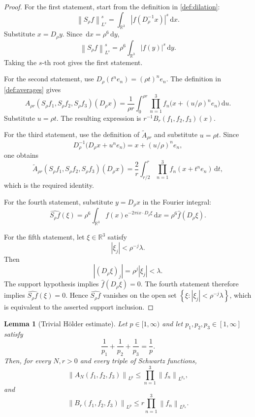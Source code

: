 \documentclass[11pt]{article}
\newtheorem{lemma}[theorem]{Lemma}
\newcommand{\R}{\mathbb{R}}
\newcommand{\e}{\mathrm{e}}
\newcommand{\dd}{\,\mathrm{d}}
\newcommand{\norm}[2]{\left\lVert #1\right\rVert_{#2}}
\newcommand{\abs}[1]{\left|#1\right|}
\newcommand{\set}[1]{\left\{#1\right\}}
\begin{document}
	\begin{proof}
		For the first statement, start from the definition in \cref{def:dilation}:
		\[
		\norm{S_\rho f}{L^s}^s
		=
		\int_{\R^3}\abs{f(D_\rho^{-1}x)}^s\dd x.
		\]
		Substitute \(x=D_\rho y\).  Since \(\dd x=\rho^6\dd y\),
		\[
		\norm{S_\rho f}{L^s}^s
		=
		\rho^6\int_{\R^3}\abs{f(y)}^s\dd y.
		\]
		Taking the \(s\)-th root gives the first statement.
		
		For the second statement, use \(D_\rho(t^n e_n)=(\rho t)^n e_n\).  The definition in \cref{def:averages} gives
		\[
		A_{\rho r}(S_\rho f_1,S_\rho f_2,S_\rho f_3)(D_\rho x)
		=
		\frac1{\rho r}\int_0^{\rho r}\prod_{n=1}^{3}f_n\bigl(x+(u/\rho)^n e_n\bigr)\dd u.
		\]
		Substitute \(u=\rho t\).  The resulting expression is \(r^{-1}B_r(f_1,f_2,f_3)(x)\).
		
		For the third statement, use the definition of \(\widetilde A_{\rho r}\) and substitute \(u=\rho t\).  Since
		\[
		D_\rho^{-1}\bigl(D_\rho x+u^n e_n\bigr)
		=
		x+(u/\rho)^n e_n,
		\]
		one obtains
		\[
		\widetilde A_{\rho r}(S_\rho f_1,S_\rho f_2,S_\rho f_3)(D_\rho x)
		=
		\frac2r\int_{r/2}^{r}\prod_{n=1}^{3}f_n(x+t^n e_n)\dd t,
		\]
		which is the required identity.
		
		For the fourth statement, substitute \(y=D_\rho x\) in the Fourier integral:
		\[
		\widehat{S_\rho f}(\xi)
		=
		\rho^6\int_{\R^3}f(x)\e^{-2\pi i x\cdot D_\rho\xi}\dd x
		=
		\rho^6\widehat f(D_\rho\xi).
		\]
		
		For the fifth statement, let \(\xi\in\R^3\) satisfy
		\[
		\abs{\xi_j}<\rho^{-j}\lambda.
		\]
		Then
		\[
		\abs{(D_\rho\xi)_j}=\rho^j\abs{\xi_j}<\lambda.
		\]
		The support hypothesis implies \(\widehat f(D_\rho\xi)=0\).  The fourth statement therefore implies \(\widehat{S_\rho f}(\xi)=0\).  Hence \(\widehat{S_\rho f}\) vanishes on the open set \(\set{\xi:\abs{\xi_j}<\rho^{-j}\lambda}\), which is equivalent to the asserted support inclusion.
	\end{proof}
	
	\begin{lemma}[Trivial H\"older estimate]\label{lem:trivial-holder}
		Let \(p\in[1,\infty)\) and let \(p_1,p_2,p_3\in[1,\infty]\) satisfy
		\[
		\frac1{p_1}+\frac1{p_2}+\frac1{p_3}=\frac1p.
		\]
		Then, for every \(N,r>0\) and every triple of Schwartz functions,
		\[
		\norm{A_N(f_1,f_2,f_3)}{L^p}
		\leq
		\prod_{n=1}^{3}\norm{f_n}{L^{p_n}},
		\]
		and
		\[
		\norm{B_r(f_1,f_2,f_3)}{L^p}
		\leq
		r\prod_{n=1}^{3}\norm{f_n}{L^{p_n}}.
		\]
	\end{lemma}
	
\end{document}
